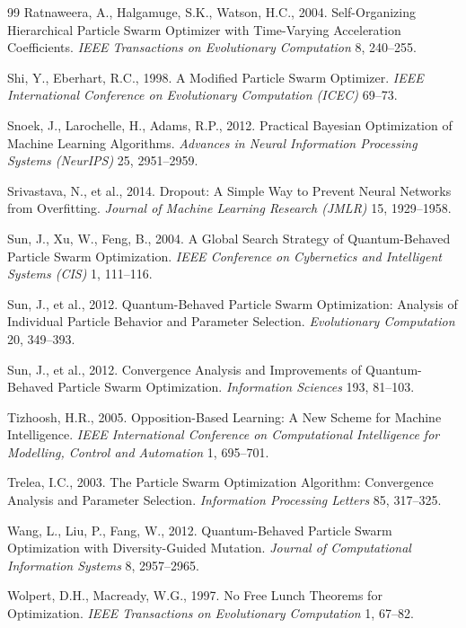 \begin{thebibliography}{99}
Ratnaweera, A., Halgamuge, S.K., Watson, H.C., 2004. Self-Organizing Hierarchical Particle Swarm Optimizer with Time-Varying Acceleration Coefficients. \textit{IEEE Transactions on Evolutionary Computation} 8, 240–255.

Shi, Y., Eberhart, R.C., 1998. A Modified Particle Swarm Optimizer. \textit{IEEE International Conference on Evolutionary Computation (ICEC)} 69–73.

Snoek, J., Larochelle, H., Adams, R.P., 2012. Practical Bayesian Optimization of Machine Learning Algorithms. \textit{Advances in Neural Information Processing Systems (NeurIPS)} 25, 2951–2959.

Srivastava, N., et al., 2014. Dropout: A Simple Way to Prevent Neural Networks from Overfitting. \textit{Journal of Machine Learning Research (JMLR)} 15, 1929–1958.

Sun, J., Xu, W., Feng, B., 2004. A Global Search Strategy of Quantum-Behaved Particle Swarm Optimization. \textit{IEEE Conference on Cybernetics and Intelligent Systems (CIS)} 1, 111–116.

Sun, J., et al., 2012. Quantum-Behaved Particle Swarm Optimization: Analysis of Individual Particle Behavior and Parameter Selection. \textit{Evolutionary Computation} 20, 349–393.

Sun, J., et al., 2012. Convergence Analysis and Improvements of Quantum-Behaved Particle Swarm Optimization. \textit{Information Sciences} 193, 81–103.

Tizhoosh, H.R., 2005. Opposition-Based Learning: A New Scheme for Machine Intelligence. \textit{IEEE International Conference on Computational Intelligence for Modelling, Control and Automation} 1, 695–701.

Trelea, I.C., 2003. The Particle Swarm Optimization Algorithm: Convergence Analysis and Parameter Selection. \textit{Information Processing Letters} 85, 317–325.

Wang, L., Liu, P., Fang, W., 2012. Quantum-Behaved Particle Swarm Optimization with Diversity-Guided Mutation. \textit{Journal of Computational Information Systems} 8, 2957–2965.

Wolpert, D.H., Macready, W.G., 1997. No Free Lunch Theorems for Optimization. \textit{IEEE Transactions on Evolutionary Computation} 1, 67–82.


\end{thebibliography}
